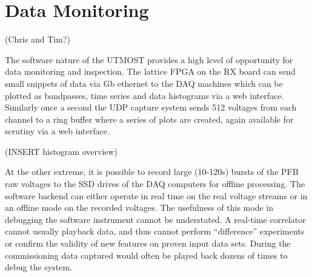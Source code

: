 \section{Data Monitoring }(Chris and Tim?)

The software nature of the UTMOST provides a high level of opportunity for data monitoring and inspection. The lattice FPGA on the RX board can send small snippets of data via Gb ethernet to the DAQ machines which can be plotted as bandpasses, time series and data histograms via a web interface. Similarly once a second the UDP capture system sends 512 voltages from each channel to a ring buffer where a series of plots are created, again available for scrutiny via a web interface.

(INSERT histogram overview)

At the other extreme, it is possible to record large (10-120s) bursts of the PFB raw voltages to the SSD drives of the DAQ computers for offline processing. The software backend can either operate in real time on the real voltage streams or in an offline mode on the recorded voltages. The usefulness of this mode in debugging the software instrument cannot be understated. A real-time correlator cannot usually playback data, and thus cannot perform ``difference'' experiments or confirm the validity of new features on proven input data sets. During the commissioning data captured would often be played back dozens of times to debug the system.
